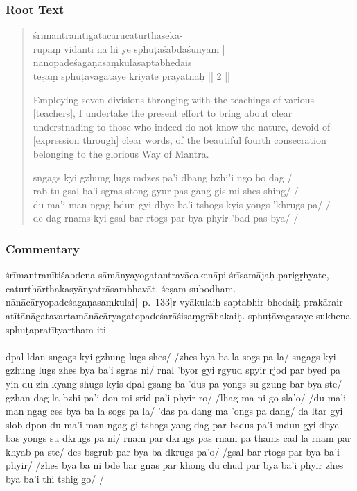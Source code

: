 \documentclass[12pt]{article}
\begin{document}
\subsubsection{Root Text}
\begin{quote}
	śrīmantranītigatacārucaturthaseka-\\
	rūpaṃ vidanti na hi ye sphuṭaśabdaśūnyam |\\
	nānopadeśagaṇasaṃkulasaptabhedais\\
	teṣāṃ sphuṭāvagataye kriyate prayatnaḥ || 2 ||

	Employing seven divisions thronging with the teachings of various [teachers], I undertake the present effort to bring about clear understnading to those who indeed do not know the nature, devoid of [expression through] clear words, of the beautiful fourth consecration belonging to the glorious Way of Mantra.

	sngags kyi gzhung lugs mdzes pa'i dbang bzhi'i ngo bo dag /\\
	rab tu gsal ba'i sgras stong gyur pas gang gis mi shes shing/ /\\
	du ma'i man ngag bdun gyi dbye ba'i tshogs kyis yongs 'khrugs pa/ /\\
	de dag rnams kyi gsal bar rtogs par bya phyir 'bad pas bya/ /
\end{quote}

\subsubsection{Commentary}
śrīmantranītiśabdena sāmānyayogatantravācakenāpi śrīsamājaḥ parigṛhyate, caturthārthakasyānyatrāsambhavāt.
śeṣaṃ subodham.
nānācāryopadeśagaṇasaṃkulai\hspace{0em}[\EDD\ p.\ 133]\hspace{0em}r vyākulaiḥ saptabhir bhedaiḥ prakārair atītānāgatavartamānācārya\footnoteB{
	°vartamānā°] \EDD ; °pravartamānā° \MS
}gatopadeśarāśisaṃgrāhakaiḥ.
sphuṭāvagataye sukhena sphuṭapratītyartham iti.\\

\textbf{\TVA}\\
dpal ldan sngags kyi gzhung lugs shes/ /zhes bya ba la sogs pa la/ sngags kyi gzhung lugs zhes bya ba'i sgras ni/ rnal 'byor gyi rgyud spyir rjod par byed pa yin du zin kyang shugs kyis dpal gsang ba 'dus pa yongs su gzung bar bya ste/ gzhan dag la bzhi pa'i don mi srid pa'i phyir ro/ /lhag ma ni go sla'o/ /du ma'i man ngag ces bya ba la sogs pa la/ 'das pa dang ma 'ongs pa dang/ da ltar gyi slob dpon du ma'i man ngag gi tshogs yang dag par bsdus pa'i mdun gyi dbye bas yongs su dkrugs pa ni/ rnam par dkrugs pas rnam pa thams cad la rnam par khyab pa ste/ des bsgrub par bya ba dkrugs pa'o/ /gsal bar rtogs par bya ba'i phyir/ /zhes bya ba ni bde bar gnas par khong du chud par bya ba'i phyir zhes bya ba'i thi tshig go/ /\\
\end{document}
